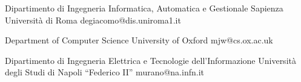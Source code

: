 \documentclass[10pt,a4paper,sans]{moderncv}
\begin{document}
{Dipartimento di Ingegneria Informatica, Automatica e Gestionale} 
{Sapienza Universit\`a di Roma}
{}
{degiacomo@dis.uniroma1.it}
% 

{Department of Computer Science}
{University of Oxford}
{}
{mjw@cs.ox.ac.uk}

{Dipartimento di Ingegneria Elettrica e Tecnologie dell'Informazione} 
{Universit\`a degli Studi di Napoli ``Federico II''}
{}
{murano@na.infn.it}



\fi
\end{document}
